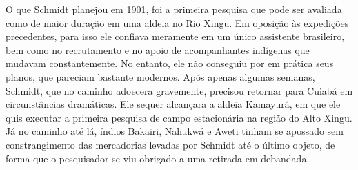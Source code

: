 
O que Schmidt planejou em 1901, foi a primeira pesquisa que pode ser
avaliada como de maior duração em uma aldeia no Rio Xingu. Em oposição
às expedições precedentes, para isso ele confiava meramente em um único
assistente brasileiro, bem como no recrutamento e no apoio de
acompanhantes indígenas que mudavam constantemente. No entanto, ele não
conseguiu por em prática seus planos, que pareciam bastante modernos.
Após apenas algumas semanas, Schmidt, que no caminho adoecera
gravemente, precisou retornar para Cuiabá em circunstâncias dramáticas.
Ele sequer alcançara a aldeia Kamayurá, em que ele quis executar a
primeira pesquisa de campo estacionária na região do Alto Xingu. Já no
caminho até lá, índios Bakairi, Nahukwá e Aweti tinham se apossado sem
constrangimento das mercadorias levadas por Schmidt até o último objeto,
de forma que o pesquisador se viu obrigado a uma retirada em debandada.

